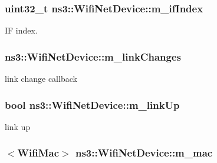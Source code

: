 \subsubsection[{\texorpdfstring{m\+\_\+if\+Index}{m_ifIndex}}]{\setlength{\rightskip}{0pt plus 5cm}uint32\+\_\+t ns3\+::\+Wifi\+Net\+Device\+::m\+\_\+if\+Index\hspace{0.3cm}{\ttfamily [private]}}\hypertarget{classns3_1_1WifiNetDevice_a40970e3141c0ab68c7482f960ebf3bfa}{}\label{classns3_1_1WifiNetDevice_a40970e3141c0ab68c7482f960ebf3bfa}


IF index. 

\subsubsection[{\texorpdfstring{m\+\_\+link\+Changes}{m_linkChanges}}]{ ns3\+::\+Wifi\+Net\+Device\+::m\+\_\+link\+Changes\hspace{0.3cm}{\ttfamily [private]}}\hypertarget{classns3_1_1WifiNetDevice_a85c0fb1cb2654801447fb9f9b7cc21d5}{}\label{classns3_1_1WifiNetDevice_a85c0fb1cb2654801447fb9f9b7cc21d5}


link change callback 

\subsubsection[{\texorpdfstring{m\+\_\+link\+Up}{m_linkUp}}]{\setlength{\rightskip}{0pt plus 5cm}bool ns3\+::\+Wifi\+Net\+Device\+::m\+\_\+link\+Up\hspace{0.3cm}{\ttfamily [private]}}\hypertarget{classns3_1_1WifiNetDevice_abcf67f62ae181e80b046bcf18e5818a6}{}\label{classns3_1_1WifiNetDevice_abcf67f62ae181e80b046bcf18e5818a6}


link up 

\subsubsection[{\texorpdfstring{m\+\_\+mac}{m_mac}}]{$<${\bf Wifi\+Mac}$>$ ns3\+::\+Wifi\+Net\+Device\+::m\+\_\+mac\hspace{0.3cm}{\ttfamily [private]}}\hypertarget{classns3_1_1WifiNetDevice_ad7a7042abee418dcdbf4b4a870f5d4cf}{}\label{classns3_1_1WifiNetDevice_ad7a7042abee418dcdbf4b4a870f5d4cf}


